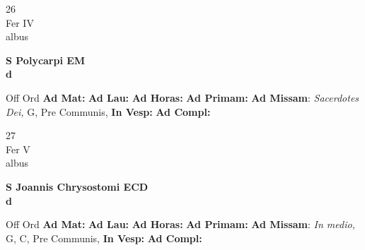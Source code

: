 \documentclass[10pt, openany]{book}
\begin{document}
    \begin{center}
        \begin{minipage}{3.5in}
            \vspace{2em}
            \begin{minipage}{0.5in}
                {\Huge 26} \\
                {\normalsize Fer IV} \\
                {\normalsize albus}
            \end{minipage}
            \begin{minipage}{3.0in}
                \textbf{ \large S Polycarpi EM \\
                \textnormal{\normalsize d}} \\ 
            \end{minipage}
            \begin{justify}Off Ord
                \textbf{Ad Mat: }
                \textbf{Ad Lau: }
                \textbf{Ad Horas: }
                \textbf{Ad Primam: }\textbf{Ad Missam}: \textit{Sacerdotes Dei,} G, Pre Communis,  
                \textbf{In Vesp: }
                \textbf{Ad Compl: }
            \end{justify}
        \end{minipage}
    \end{center}

    \begin{center}
        \begin{minipage}{3.5in}
            \vspace{2em}
            \begin{minipage}{0.5in}
                {\Huge 27} \\
                {\normalsize Fer V} \\
                {\normalsize albus}
            \end{minipage}
            \begin{minipage}{3.0in}
                \textbf{ \large S Joannis Chrysostomi ECD \\
                \textnormal{\normalsize d}} \\ 
            \end{minipage}
            \begin{justify}Off Ord
                \textbf{Ad Mat: }
                \textbf{Ad Lau: }
                \textbf{Ad Horas: }
                \textbf{Ad Primam: }\textbf{Ad Missam}: \textit{In medio,} G, C, Pre Communis,  
                \textbf{In Vesp: }
                \textbf{Ad Compl: }
            \end{justify}
        \end{minipage}
    \end{center}
\end{document}
